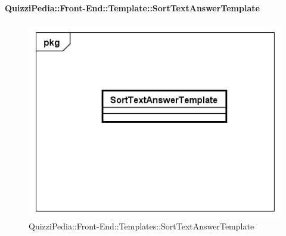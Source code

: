		\paragraph{QuizziPedia::Front-End::Template::SortTextAnswerTemplate}
		
		\label{QuizziPedia::Front-End::Templates::SortTextAnswerTemplate}
		
		\begin{figure}[ht]
			\centering
			\includegraphics[scale=0.5,keepaspectratio]{UML/Classi/Front-End/QuizziPedia_Front-end_Templates_SortTextAnswerTemplate.png}
			\caption{QuizziPedia::Front-End::Templates::SortTextAnswerTemplate}
		\end{figure} \FloatBarrier
		
